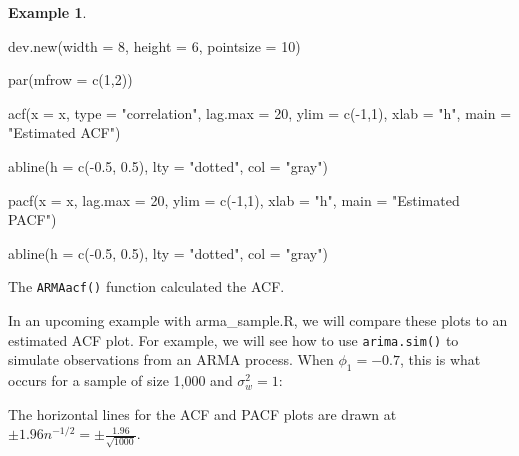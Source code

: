 \documentclass[
]{book}
\newenvironment{Shaded}{\begin{snugshade}}{\end{snugshade}}
\newcommand{\AttributeTok}[1]{\textcolor[rgb]{0.77,0.63,0.00}{#1}}
\newcommand{\DecValTok}[1]{\textcolor[rgb]{0.00,0.00,0.81}{#1}}
\newcommand{\FloatTok}[1]{\textcolor[rgb]{0.00,0.00,0.81}{#1}}
\newcommand{\FunctionTok}[1]{\textcolor[rgb]{0.00,0.00,0.00}{#1}}
\newcommand{\NormalTok}[1]{#1}
\newcommand{\SpecialCharTok}[1]{\textcolor[rgb]{0.00,0.00,0.00}{#1}}
\newcommand{\StringTok}[1]{\textcolor[rgb]{0.31,0.60,0.02}{#1}}
\theoremstyle{definition}
\theoremstyle{definition}
\newtheorem{example}{Example}[chapter]
\theoremstyle{definition}
\theoremstyle{definition}
\theoremstyle{remark}
\begin{document}
\begin{example}
\begin{Shaded}
\begin{Highlighting}[]
\FunctionTok{dev.new}\NormalTok{(}\AttributeTok{width =} \DecValTok{8}\NormalTok{, }\AttributeTok{height =} \DecValTok{6}\NormalTok{, }\AttributeTok{pointsize =} \DecValTok{10}\NormalTok{)}
  
\FunctionTok{par}\NormalTok{(}\AttributeTok{mfrow =} \FunctionTok{c}\NormalTok{(}\DecValTok{1}\NormalTok{,}\DecValTok{2}\NormalTok{))}

  
\FunctionTok{acf}\NormalTok{(}\AttributeTok{x =}\NormalTok{ x, }\AttributeTok{type =} \StringTok{"correlation"}\NormalTok{, }\AttributeTok{lag.max =} \DecValTok{20}\NormalTok{, }\AttributeTok{ylim =} \FunctionTok{c}\NormalTok{(}\SpecialCharTok{{-}}\DecValTok{1}\NormalTok{,}\DecValTok{1}\NormalTok{), }\AttributeTok{xlab =} \StringTok{"h"}\NormalTok{,}
    \AttributeTok{main =} \StringTok{"Estimated ACF"}\NormalTok{)}
  
\FunctionTok{abline}\NormalTok{(}\AttributeTok{h =} \FunctionTok{c}\NormalTok{(}\SpecialCharTok{{-}}\FloatTok{0.5}\NormalTok{, }\FloatTok{0.5}\NormalTok{), }\AttributeTok{lty =} \StringTok{"dotted"}\NormalTok{, }\AttributeTok{col =} \StringTok{"gray"}\NormalTok{)}
  
\FunctionTok{pacf}\NormalTok{(}\AttributeTok{x =}\NormalTok{ x, }\AttributeTok{lag.max =} \DecValTok{20}\NormalTok{, }\AttributeTok{ylim =} \FunctionTok{c}\NormalTok{(}\SpecialCharTok{{-}}\DecValTok{1}\NormalTok{,}\DecValTok{1}\NormalTok{), }\AttributeTok{xlab =} \StringTok{"h"}\NormalTok{,}
    \AttributeTok{main =} \StringTok{"Estimated PACF"}\NormalTok{)}
  
\FunctionTok{abline}\NormalTok{(}\AttributeTok{h =} \FunctionTok{c}\NormalTok{(}\SpecialCharTok{{-}}\FloatTok{0.5}\NormalTok{, }\FloatTok{0.5}\NormalTok{), }\AttributeTok{lty =} \StringTok{"dotted"}\NormalTok{, }\AttributeTok{col =} \StringTok{"gray"}\NormalTok{)}
\end{Highlighting}
\end{Shaded}

\end{example}

The \texttt{ARMAacf()} function calculated the ACF.

In an upcoming example with arma\_sample.R, we will compare these plots to an estimated ACF plot. For example, we will see how to use \texttt{arima.sim()} to simulate observations from an ARMA process. When \(\phi_1 = -0.7\), this is what occurs for a sample of size 1,000 and \(\sigma_w^2=1\):

The horizontal lines for the ACF and PACF plots are drawn at \(\pm 1.96n^{-1/2} = \pm \frac{1.96}{\sqrt{1000}}\).
\end{document}
